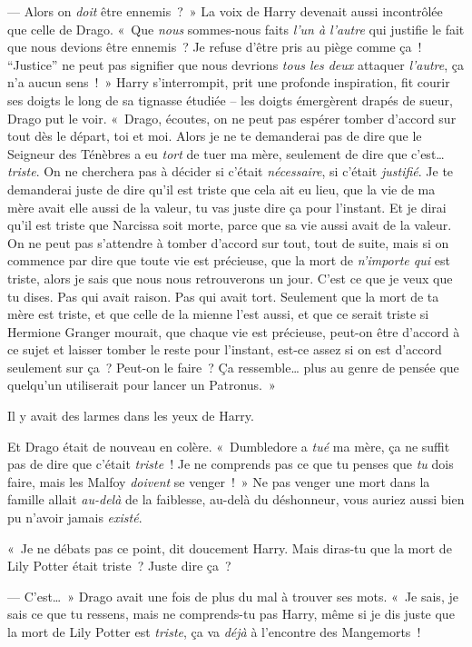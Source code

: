 --- Alors on \emph{doit} être ennemis~?~» La voix de Harry devenait aussi incontrôlée que celle de Drago. «~Que \emph{nous} sommes-nous faits \emph{l'un à l'autre} qui justifie le fait que nous devions être ennemis~? Je refuse d'être pris au piège comme ça~! “Justice” ne peut pas signifier que nous devrions \emph{tous les deux} attaquer \emph{l'autre}, ça n'a aucun sens~!~» Harry s'interrompit, prit une profonde inspiration, fit courir ses doigts le long de sa tignasse étudiée -- les doigts émergèrent drapés de sueur, Drago put le voir. «~Drago, écoutes, on ne peut pas espérer tomber d'accord sur tout dès le départ, toi et moi. Alors je ne te demanderai pas de dire que le Seigneur des Ténèbres a eu \emph{tort} de tuer ma mère, seulement de dire que c'est… \emph{triste}. On ne cherchera pas à décider si c'était \emph{nécessaire}, si c'était \emph{justifié}. Je te demanderai juste de dire qu'il est triste que cela ait eu lieu, que la vie de ma mère avait elle aussi de la valeur, tu vas juste dire ça pour l'instant. Et je dirai qu'il est triste que Narcissa soit morte, parce que sa vie aussi avait de la valeur. On ne peut pas s'attendre à tomber d'accord sur tout, tout de suite, mais si on commence par dire que toute vie est précieuse, que la mort de \emph{n'importe qui} est triste, alors je sais que nous nous retrouverons un jour. C'est ce que je veux que tu dises. Pas qui avait raison. Pas qui avait tort. Seulement que la mort de ta mère est triste, et que celle de la mienne l'est aussi, et que ce serait triste si Hermione Granger mourait, que chaque vie est précieuse, peut-on être d'accord à ce sujet et laisser tomber le reste pour l'instant, est-ce assez si on est d'accord seulement sur ça~? Peut-on le faire~? Ça ressemble… plus au genre de pensée que quelqu'un utiliserait pour lancer un Patronus.~»

Il y avait des larmes dans les yeux de Harry.

Et Drago était de nouveau en colère. «~Dumbledore a \emph{tué} ma mère, ça ne suffit pas de dire que c'était \emph{triste}~! Je ne comprends pas ce que tu penses que \emph{tu} dois faire, mais les Malfoy \emph{doivent} se venger~!~» Ne pas venger une mort dans la famille allait \emph{au-delà} de la faiblesse, au-delà du déshonneur, vous auriez aussi bien pu n'avoir jamais \emph{existé}.

«~Je ne débats pas ce point, dit doucement Harry. Mais diras-tu que la mort de Lily Potter était triste~? Juste dire ça~?

--- C'est…~» Drago avait une fois de plus du mal à trouver ses mots. «~Je sais, je sais ce que tu ressens, mais ne comprends-tu pas Harry, même si je dis juste que la mort de Lily Potter est \emph{triste}, ça va \emph{déjà} à l'encontre des Mangemorts~!

